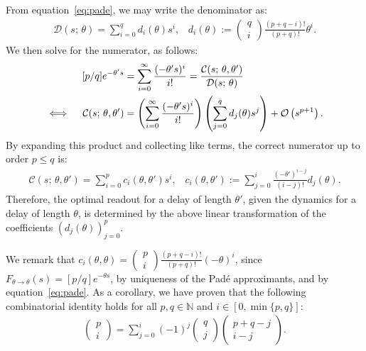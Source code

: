 From equation~\ref{eq:pade}, we may write the denominator as:
\begin{align*}
\mathcal{D}(s; \, \theta) = \sum_{i=0}^q d_i(\theta) s^i \text{,} \quad d_i(\theta) := \begin{pmatrix}q \\ i\end{pmatrix} \frac{(p + q - i)!}{(p + q)!} \theta^i \text{.}
\end{align*}
We then solve for the numerator, as follows:
\begin{align*}
&& [p/q] e^{-\theta' s} &= \sum_{i=0}^\infty \frac{(-\theta' s)^i}{i !} = \frac{\mathcal{C}(s; \, \theta, \theta')}{\mathcal{D}(s; \, \theta)} & \\
&& \iff \quad \mathcal{C}(s; \, \theta, \theta') &= \left( \sum_{i=0}^\infty \frac{(-\theta' s)^i}{i !} \right) \left( \sum_{j=0}^q d_j(\theta) s^j \right) + \mathcal{O}\left({s^{p + 1}}\right) \text{.}
\end{align*}
By expanding this product and collecting like terms, the correct numerator up to order $p \le q$ is:
\begin{align*}
\mathcal{C}(s; \, \theta, \theta') = \sum_{i=0}^p c_i(\theta, \theta') s^i \text{,} \quad c_i(\theta, \theta') :=  \sum_{j=0}^i \frac{(- \theta')^{i - j}}{(i - j)!} d_j(\theta) \text{.}
\end{align*}
Therefore, the optimal readout for a delay of length $\theta'$, given the dynamics for a delay of length $\theta$, is determined by the above linear transformation of the coefficients $\left( d_j(\theta) \right)_{j=0}^p$.

We remark that $c_i(\theta, \theta) = \begin{pmatrix}p \\ i\end{pmatrix} \frac{(p + q - i)!}{(p + q)!} (-\theta)^i$, since $F_{\theta \rightarrow \theta}(s) = [p/q] e^{-\theta s}$, by uniqueness of the Pad\'e approximants, and by equation~\ref{eq:pade}.
As a corollary, we have proven that the following combinatorial identity holds for all $p, q \in \mathbb{N}$ and $i \in \left[ 0, \min\{p, q\} \right]$:
\begin{align*}
\begin{pmatrix}p \\ i\end{pmatrix} = \sum_{j=0}^i (-1)^j \begin{pmatrix}q \\ j\end{pmatrix} \begin{pmatrix}p + q - j \\ i - j\end{pmatrix} \text{.}
\end{align*}

